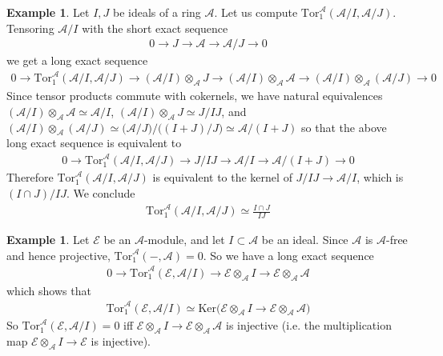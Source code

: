 \documentclass[12pt,b5paper,notitlepage]{report}
\theoremstyle{definition}
\newtheorem{eg}[df]{Example}
\theoremstyle{plain}
\newcommand{\mc}{\mathcal}
\newcommand{\Ker}{\mathrm{Ker}}
\newcommand{\Tor}{\mathrm{Tor}}
\numberwithin{equation}{section}
\begin{document}
\begin{eg}\label{lb262}
Let $I,J$ be ideals of a ring $\mc A$. Let us compute $\Tor_1^{\mc A}(\mc A/I,\mc A/J)$. Tensoring $\mc A/I$ with the short exact sequence
\begin{align*}
0\rightarrow J\rightarrow\mc A\rightarrow\mc A/J\rightarrow0
\end{align*}
we get a long exact sequence
\begin{align*}
0\rightarrow\Tor_1^{\mc A}(\mc A/I,\mc A/J)\rightarrow(\mc A/I)\otimes_{\mc A}J\rightarrow(\mc A/I)\otimes_{\mc A}\mc A\rightarrow(\mc A/I)\otimes_{\mc A}(\mc A/J)\rightarrow0
\end{align*}
Since tensor products commute with cokernels, we have natural equivalences $(\mc A/I)\otimes_{\mc A}\mc A\simeq\mc A/I$, $(\mc A/I)\otimes_{\mc A}J\simeq J/I J$, and $(\mc A/I)\otimes_{\mc A}(\mc A/J)\simeq \big(\mc A/J\big)\big/\big((I+J)/J\big)\simeq\mc A/(I+J)$ so that the above long exact sequence is equivalent to
\begin{align*}
0\rightarrow\Tor_1^{\mc A}(\mc A/I,\mc A/J)\rightarrow J/IJ\rightarrow \mc A/I\rightarrow \mc A/(I+J)\rightarrow0
\end{align*}
Therefore $\Tor_1^{\mc A}(\mc A/I,\mc A/J)$ is equivalent to the kernel of $J/IJ\rightarrow\mc A/I$, which is $(I\cap J)/IJ$. We conclude
\begin{align}
\Tor_1^{\mc A}(\mc A/I,\mc A/J)\simeq \frac{I\cap J}{IJ}
\end{align}
\end{eg}

\begin{eg}\label{lb265}
Let $\mc E$ be an $\mc A$-module, and let $I\subset\mc A$ be an ideal. Since $\mc A$ is $\mc A$-free and hence projective, $\Tor_1^{\mc A}(-,\mc A)=0$. So we have a long exact sequence
\begin{align}
0\rightarrow \Tor_1^{\mc A}(\mc E,\mc A/I)\rightarrow\mc E\otimes_{\mc A}I\rightarrow\mc E\otimes_{\mc A}\mc A
\end{align}
which shows that 
\begin{align}
\Tor_1^{\mc A}(\mc E,\mc A/I)\simeq\Ker\big(\mc E\otimes_{\mc A}I\rightarrow\mc E\otimes_{\mc A}\mc A \big)   \label{eq224}
\end{align}
So $\Tor_1^{\mc A}(\mc E,\mc A/I)=0$ iff $\mc E\otimes_{\mc A}I\rightarrow\mc E\otimes_{\mc A}\mc A$ is injective (i.e. the multiplication map $\mc E\otimes_{\mc A}I\rightarrow\mc E$ is injective).
\end{eg}
\end{document}
